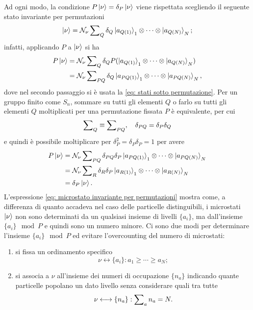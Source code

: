 Ad ogni modo, la condizione $P\ket{\nu} = \delta_P\ket{\nu}$ viene rispettata scegliendo il seguente stato invariante per permutazioni
\begin{equation}
\label{eq: microstato invariante per permutazioni}
    \ket{\nu} = \mathcal{N}_\nu\sum\nolimits_Q\delta_Q\ket{a_{Q(1)}}_1 \otimes \cdots \otimes \ket{a_{Q(N)}}_N;
\end{equation}
infatti, applicando $P$ a $\ket{\nu}$ si ha
\begin{equation}
    \begin{split}
        P\ket{\nu} &= \mathcal{N}_\nu\sum\nolimits_Q\delta_QP(\ket{a_{Q(1)}}_1 \otimes \cdots \otimes \ket{a_{Q(N)}}_N) \\
        &= \mathcal{N}_\nu\sum\nolimits_{PQ}\delta_Q\ket{a_{PQ(1)}}_1 \otimes \cdots \otimes \ket{a_{PQ(N)}}_N,
    \end{split}
\end{equation}
dove nel secondo passaggio si è usata la \eqref{eq: stati sotto permutazione}. Per un gruppo finito come $S_n$, sommare su tutti gli elementi $Q$ o farlo su tutti gli elementi $Q$ moltiplicati per una permutazione fissata $P$ è equivalente, per cui
\begin{equation}
    \sum\nolimits_Q \equiv \sum\nolimits_{PQ},\quad \delta_{PQ} = \delta_P\delta_Q
\end{equation}
e quindi è possibile moltiplicare per $\delta_P^2 = \delta_P\delta_P = 1$ per avere
\begin{equation}
    \begin{split}
        P\ket{\nu} &= \mathcal{N}_\nu\sum\nolimits_{PQ}\delta_{PQ}\delta_P\ket{a_{PQ(1)}}_1 \otimes \cdots \otimes \ket{a_{PQ(N)}}_N \\
        &= \mathcal{N}_\nu\sum\nolimits_{R}\delta_R\delta_P\ket{a_{R(1)}}_1 \otimes \cdots \otimes \ket{a_{R(N)}}_N \\
        &= \delta_P\ket{\nu}.
    \end{split}
\end{equation}
L'espressione \eqref{eq: microstato invariante per permutazioni} mostra come, a differenza di quanto accadeva nel caso delle particelle distinguibili, i microstati $\ket{\nu}$ non sono determinati da un qualsiasi insieme di livelli $\{a_i\}$, ma dall'insieme $\{a_i\}\mod{P}$ e quindi sono un numero minore. Ci sono due modi per determinare l'insieme $\{a_i\}\mod{P}$ ed evitare l'overcounting del numero di microstati:
\begin{enumerate}
    \item si fissa un ordinamento specifico
    \begin{equation}
        \nu \longleftrightarrow \{a_i\} : a_1 \ge \cdots \ge a_N;
    \end{equation}
    \item si associa a $\nu$ all'insieme dei numeri di occupazione $\{n_a\}$ indicando quante particelle popolano un dato livello senza considerare quali tra tutte
    \begin{equation}
        \nu \longleftrightarrow \{n_a\} : \sum\nolimits_an_a = N.
    \end{equation}
\end{enumerate}
